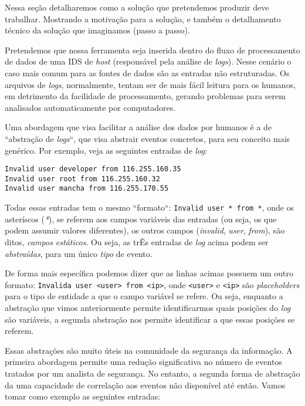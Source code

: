 \documentclass[
	12pt,				%
	openright,			%
	twoside,			%
	a4paper,			%
	english,			%
	spanish,			%
	brazil,				%
	]{abntex2}
\begin{document}
Nessa seção detalharemos como a solução que pretendemos produzir deve trabalhar. Mostrando a motivação para a solução, e também o detalhamento técnico da solução que imaginamos (passo a passo).

Pretendemos que nossa ferramenta seja inserida dentro do fluxo de processamento de dados de uma IDS de \emph{host} (responsável pela análise de \emph{logs}). Nesse cenário o caso mais comum para as fontes de dados são as entradas não estruturadas. Os arquivos de \emph{logs}, normalmente, tentam ser de mais fácil leitura para os humanos, em detrimento da facilidade de processamento, gerando problemas para serem analisados automaticamente por computadores. 

Uma abordagem que visa facilitar a análise dos dados por humanos é a de ``abstração de \emph{logs}``, que visa abstrair eventos concretos, para seu conceito mais genérico. Por exemplo, veja as seguintes entradas de \emph{log}:

\begin{verbatim}
Invalid user developer from 116.255.160.35
Invalid user root from 116.255.160.32
Invalid user mancha from 116.255.170.55
\end{verbatim}
	
Todas essas entradas tem o mesmo ``formato``: \verb|Invalid user * from *|, onde os asteríscos (\emph{*}), se referem aos campos variáveis das entradas (ou seja, os que podem assumir valores diferentes), os outros campos (\emph{invalid}, \emph{user}, \emph{from}), são ditos, \emph{campos estáticos}. Ou seja, as trÊs entradas de \emph{log} acima podem ser \emph{abstraídas}, para um único \emph{tipo} de evento. 

De forma mais específica podemos dizer que as linhas acimas possuem um outro formato: \verb|Invalida user <user> from <ip>|, onde \verb|<user>| e \verb|<ip>| são \emph{placeholders} para o tipo de entidade a que o campo variável se refere. Ou seja, enquanto a abstração que vimos anteriormente permite identificarmos quais posições do \emph{log} são variáveis, a segunda abstração nos permite identificar a que essas posições se referem.

Essas abstrações são muito úteis na comunidade da segurança da informação. A primeira abordagem permite uma redução significativa no número de eventos tratados por um analista de segurança. No entanto, a segunda forma de abstração da uma capacidade de correlação aos eventos não disponível até então. Vamos tomar como exemplo as seguintes entradas:
\end{document}
